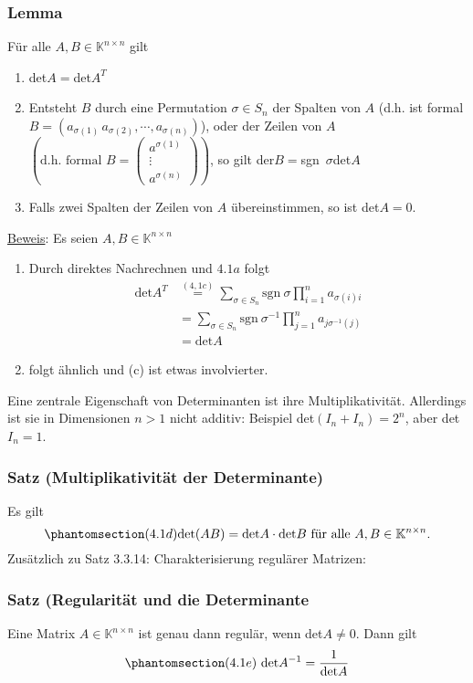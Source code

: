 \subsubsection{Lemma}
Für alle $A,B\in\mathbb{K}^{n\times n}$ gilt
\renewcommand{\labelenumi}{(\alph{enumi})}
\begin{enumerate}
\item det$A=$det$A^T$
\item Entsteht $B$ durch eine Permutation $\sigma \in S_n$ der Spalten von $A$ (d.h. ist formal $B=(a_{\sigma (1)}\,a_{\sigma (2)},\cdots ,a_{\sigma (n)})$), oder der Zeilen von $A$ $\left(\text{d.h. formal }B=\begin{pmatrix}a^{\sigma (1)}\\ \vdots \\ a^{\sigma (n)}\end{pmatrix}\right)$, so gilt der$B=$sgn~$\sigma$det$A$
\item Falls zwei Spalten der Zeilen von $A$ übereinstimmen, so ist det$A=0$.
\end{enumerate}
\underline{Beweis}: Es seien $A,B\in\mathbb{K}^{n\times n}$
\begin{enumerate}
\item Durch direktes Nachrechnen und \hyperref[4.1a]{$4.1a$} folgt 
\begin{align*}
\mathrm{det}A^T&\stackrel{(4,1c)}{=}\sum _{\sigma\in S_n}\mathrm{sgn~}\sigma \prod _{i=1}^n a_{\sigma (i)i}\\
&=\sum _{\sigma \in S_n} \mathrm{sgn~}\sigma ^{-1}\prod _{j=1}^n a_{j\sigma ^{-1}(j)}\\
&= \mathrm{det}A
\end{align*}
\item folgt ähnlich und (c) ist etwas involvierter.
\end{enumerate}
Eine zentrale Eigenschaft von Determinanten ist ihre Multiplikativität.  Allerdings ist sie in Dimensionen $n>1$ nicht additiv: Beispiel det$(I_n+I_n)=2^n$, aber det$I_n=1$.
\subsubsection{Satz (Multiplikativität der Determinante)}
\label{4.1.10}
Es gilt \[\phantomsection\label{4.1d}(4.1d)\mathrm{det}(AB)=\mathrm{det}A\cdot\mathrm{det}B\text{ für alle }A,B\in\mathbb{K}^{n\times n}.\]
Zusätzlich zu Satz 3.3.14: Charakterisierung regulärer Matrizen: 
\subsubsection{Satz (Regularität und die Determinante}
\label{4.1.11}
Eine Matrix $A\in\mathbb{K}^{n\times n}$ ist genau dann regulär, wenn det$A\not= 0$.  Dann gilt
\[\phantomsection\label{4.1e}(4.1e)\ \mathrm{det}A^{-1}=\frac{1}{\mathrm{det}A}\]
